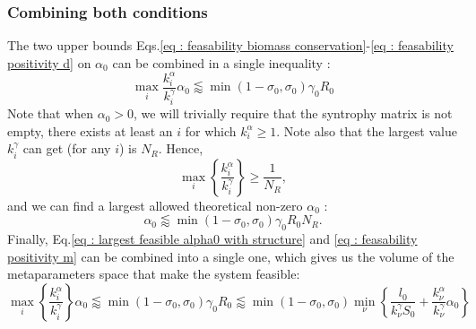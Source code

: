 \documentclass[12pt, titlepage]{report}
\begin{document}
\subsubsection{Combining both conditions}
The two upper bounds Eqs.\eqref{eq : feasability biomass conservation}-\eqref{eq : feasability positivity d} on $\alpha_0$ can be combined in a single inequality :
\begin{equation} \label{eq : largest feasible alpha0 with structure}
\max_i{\frac{k_i^\alpha}{k_i^\gamma}} \alpha_0 \lessapprox \min(1-\sigma_0, \sigma_0) \gamma_0 R_0
\end{equation}
Note that when $\alpha_0 > 0$, we will trivially require that the syntrophy matrix is not empty, \ie there exists at least an $i$ for which $k_i^\alpha \geq 1$. Note also that the largest value $k_i^\gamma$ can get (for any $i$) is $N_R$. Hence,
\begin{equation}
\max_i\left\{ \frac{k_i^\alpha}{k_i^\gamma} \right\} \geq \frac{1}{N_R},
\end{equation}
and we can find a largest allowed theoretical non-zero $\alpha_0$ :
\begin{equation}
\alpha_0 \lessapprox \min(1-\sigma_0, \sigma_0) \gamma_0 R_0 N_R. \label{eq : largest feasible alpha0}
\end{equation}
Finally, Eq.\eqref{eq : largest feasible alpha0 with structure} and \eqref{eq : feasability positivity m} can be combined into a single one, which gives us the volume of the metaparameters space that make the system feasible:
\begin{equation}
\boxed{
\max_i\left\{\frac{k_i^\alpha}{k_i^\gamma}\right\} \alpha_0
\lessapprox \min(1-\sigma_0, \sigma_0) \gamma_0 R_0
\lessapprox
\min \left(1-\sigma_0, \sigma_0 \right) \min_\nu \left\{ \frac{l_0}{k_\nu^\gamma S_0} + \frac{k_\nu^\alpha}{k_\nu^\gamma}\alpha_0\right\}
}\label{eq : overall feasability constraint metaparameters}
\end{equation}
\end{document}
